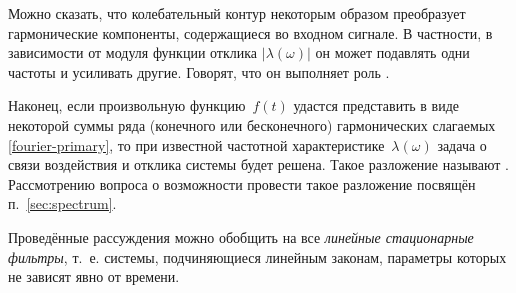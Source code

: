 
Можно сказать, что колебательный контур некоторым образом
преобразует гармонические компоненты, содержащиеся во входном сигнале.
В частности, в зависимости от модуля функции отклика $|\lambda(\omega)|$ 
он может подавлять одни частоты и усиливать другие.
Говорят, что он выполняет роль .

Наконец, если произвольную функцию~$f(t)$ удастся представить в виде
некоторой суммы ряда (конечного или бесконечного) гармонических слагаемых
\eqref{fourier-primary}, то при известной частотной характеристике~$\lambda(\omega)$ 
задача о связи воздействия и отклика системы будет решена.
Такое разложение называют . Рассмотрению вопроса о возможности 
провести такое разложение посвящён п.~\ref{sec:spectrum}.


%


Проведённые рассуждения можно обобщить на все \emph{линейные стационарные
фильтры}, т.~е. системы, подчиняющиеся линейным законам, параметры которых 
не зависят явно от времени.


